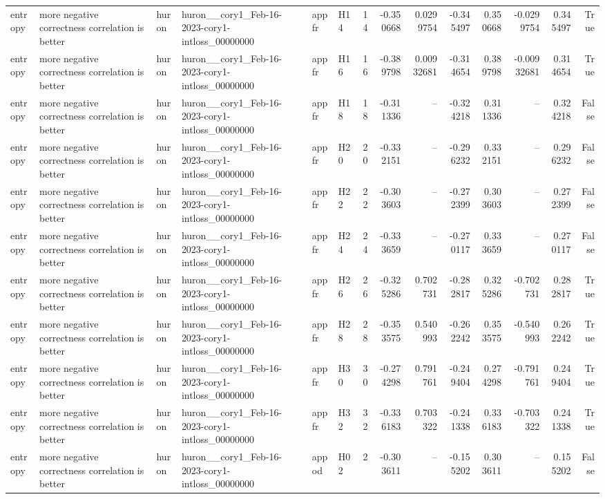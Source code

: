 \begin{longtable}{llllllrrrrrrrr}
entropy & more negative correctness correlation is better & huron & huron\_\_cory1\_Feb-16-2023-cory1-intloss\_00000000 & appfr & H14 & 14 & -0.350668 & 0.0299754 & -0.345497 & 0.350668 & -0.0299754 & 0.345497 & True \\
entropy & more negative correctness correlation is better & huron & huron\_\_cory1\_Feb-16-2023-cory1-intloss\_00000000 & appfr & H16 & 16 & -0.389798 & 0.00932681 & -0.314654 & 0.389798 & -0.00932681 & 0.314654 & True \\
entropy & more negative correctness correlation is better & huron & huron\_\_cory1\_Feb-16-2023-cory1-intloss\_00000000 & appfr & H18 & 18 & -0.311336 & -- & -0.324218 & 0.311336 & -- & 0.324218 & False \\
entropy & more negative correctness correlation is better & huron & huron\_\_cory1\_Feb-16-2023-cory1-intloss\_00000000 & appfr & H20 & 20 & -0.332151 & -- & -0.296232 & 0.332151 & -- & 0.296232 & False \\
entropy & more negative correctness correlation is better & huron & huron\_\_cory1\_Feb-16-2023-cory1-intloss\_00000000 & appfr & H22 & 22 & -0.303603 & -- & -0.272399 & 0.303603 & -- & 0.272399 & False \\
entropy & more negative correctness correlation is better & huron & huron\_\_cory1\_Feb-16-2023-cory1-intloss\_00000000 & appfr & H24 & 24 & -0.333659 & -- & -0.270117 & 0.333659 & -- & 0.270117 & False \\
entropy & more negative correctness correlation is better & huron & huron\_\_cory1\_Feb-16-2023-cory1-intloss\_00000000 & appfr & H26 & 26 & -0.325286 & 0.702731 & -0.282817 & 0.325286 & -0.702731 & 0.282817 & True \\
entropy & more negative correctness correlation is better & huron & huron\_\_cory1\_Feb-16-2023-cory1-intloss\_00000000 & appfr & H28 & 28 & -0.353575 & 0.540993 & -0.262242 & 0.353575 & -0.540993 & 0.262242 & True \\
entropy & more negative correctness correlation is better & huron & huron\_\_cory1\_Feb-16-2023-cory1-intloss\_00000000 & appfr & H30 & 30 & -0.274298 & 0.791761 & -0.249404 & 0.274298 & -0.791761 & 0.249404 & True \\
entropy & more negative correctness correlation is better & huron & huron\_\_cory1\_Feb-16-2023-cory1-intloss\_00000000 & appfr & H32 & 32 & -0.336183 & 0.703322 & -0.241338 & 0.336183 & -0.703322 & 0.241338 & True \\
entropy & more negative correctness correlation is better & huron & huron\_\_cory1\_Feb-16-2023-cory1-intloss\_00000000 & appod & H02 & 2 & -0.303611 & -- & -0.155202 & 0.303611 & -- & 0.155202 & False \\

\end{longtable}
